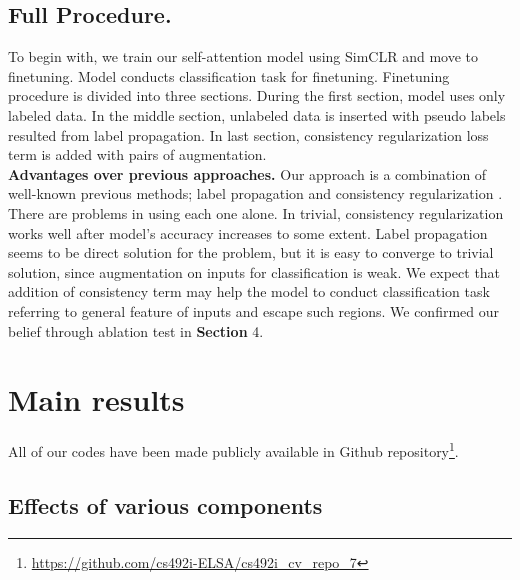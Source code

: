 \documentclass[10pt,twocolumn,letterpaper]{article}
\begin{document}
	\subsection{Full Procedure.} To begin with, we train our self-attention model using SimCLR and move to finetuning. Model conducts classification task for finetuning. Finetuning procedure is divided into three sections. During the first section, model uses only labeled data. In the middle section, unlabeled data is inserted with pseudo labels resulted from label propagation. In last section, consistency regularization loss term is added with pairs of augmentation.\\
	\textbf{Advantages over previous approaches.} Our approach is a combination of well-known previous methods; label propagation \cite{Iscen2019} and consistency regularization \cite{Xie2020}. There are problems in using each one alone. In trivial, consistency regularization works well after model's accuracy increases to some extent. Label propagation seems to be direct solution for the problem, but it is easy to converge to trivial solution, since augmentation on inputs for classification is weak. We expect that addition of consistency term may help the model to conduct classification task referring to general feature of inputs and escape such regions. We confirmed our belief through ablation test in \textbf{Section} 4.
	
	\section{Main results}
	All of our codes have been made publicly available in Github repository\footnote{\url{https://github.com/cs492i-ELSA/cs492i_cv_repo_7}}.
	
	\subsection{Effects of various components}
\end{document}
